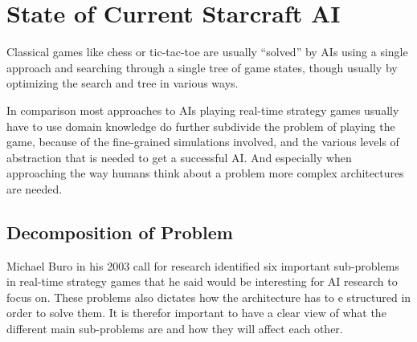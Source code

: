 
\section{State of Current Starcraft AI}
Classical games like chess or tic-tac-toe are usually ``solved'' by AIs using a
single approach and searching through a single tree of game states, though
usually by optimizing the search and tree in various ways.

In comparison most approaches to AIs playing real-time strategy games usually
have to use domain knowledge do further subdivide the problem of playing the
game, because of the fine-grained simulations involved, and the various levels
of abstraction that is needed to get a successful AI. And especially when
approaching the way humans think about a problem more complex architectures
are needed.

\subsection{Decomposition of Problem}
Michael Buro in his 2003 call for research \cite{buro2003real} identified six
important sub-problems in real-time strategy games that he said would be
interesting for AI research to focus on. These problems also dictates how the architecture has to e structured in order to solve them. It is therefor important to have a clear view of what the different main sub-problems are and how they will affect each other.

